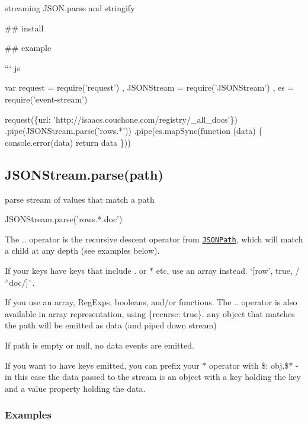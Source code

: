 streaming J\+S\+O\+N.\+parse and stringify



\#\# install 
\begin{DoxyCode}
## example

``` js

var request = require('request')
  , JSONStream = require('JSONStream')
  , es = require('event-stream')

request(\{url: 'http://isaacs.couchone.com/registry/\_all\_docs'\})
  .pipe(JSONStream.parse('rows.*'))
  .pipe(es.mapSync(function (data) \{
    console.error(data)
    return data
  \}))
\end{DoxyCode}


\subsection*{J\+S\+O\+N\+Stream.\+parse(path)}

parse stream of values that match a path


\begin{DoxyCode}
JSONStream.parse('rows.*.doc')
\end{DoxyCode}


The {\ttfamily ..} operator is the recursive descent operator from \href{http://goessner.net/articles/JsonPath/}{\tt J\+S\+O\+N\+Path}, which will match a child at any depth (see examples below).

If your keys have keys that include {\ttfamily .} or {\ttfamily $\ast$} etc, use an array instead. `\mbox{[}\textquotesingle{}row', true, /$^\wedge$doc/\mbox{]}\`{}.

If you use an array, {\ttfamily Reg\+Exp}s, booleans, and/or functions. The {\ttfamily ..} operator is also available in array representation, using {\ttfamily \{recurse\+: true\}}. any object that matches the path will be emitted as \textquotesingle{}data\textquotesingle{} (and {\ttfamily pipe}d down stream)

If {\ttfamily path} is empty or null, no \textquotesingle{}data\textquotesingle{} events are emitted.

If you want to have keys emitted, you can prefix your {\ttfamily $\ast$} operator with {\ttfamily \$}\+: {\ttfamily obj.\$$\ast$} -\/ in this case the data passed to the stream is an object with a {\ttfamily key} holding the key and a {\ttfamily value} property holding the data.

\subsubsection*{Examples}

